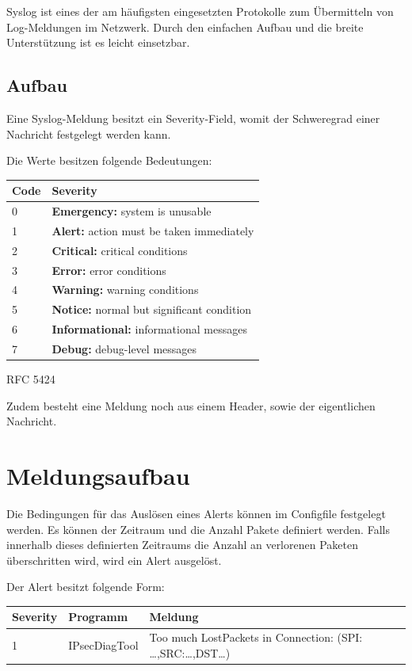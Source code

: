 Syslog ist eines der am häufigsten eingesetzten Protokolle zum Übermitteln von Log-Meldungen im Netzwerk. Durch den einfachen Aufbau und die breite Unterstützung ist es leicht einsetzbar.


\subsection{ Aufbau}

Eine Syslog-Meldung besitzt ein Severity-Field, womit der Schweregrad einer Nachricht festgelegt werden kann.

\noindent Die Werte besitzen folgende Bedeutungen:

\begin{tabular}{|p{0.5in}|p{3.7in}|} \hline 
Code & \textbf{Severity} \\ \hline 
0 & \textbf{Emergency:} system is unusable \\ \hline 
1 & \textbf{Alert:} action must be taken immediately \\ \hline 
2 & \textbf{Critical:} critical conditions \\ \hline 
3 & \textbf{Error:} error conditions \\ \hline 
4 & \textbf{Warning:} warning conditions \\ \hline 
5 & \textbf{Notice:} normal but significant condition \\ \hline 
6 & \textbf{Informational:} informational messages \\ \hline 
7 & \textbf{Debug:} debug-level messages \\ \hline 
\end{tabular}

RFC 5424

Zudem besteht eine Meldung noch aus einem Header, sowie der eigentlichen Nachricht.

\section{ Meldungsaufbau}

\noindent Die Bedingungen für das Auslösen eines Alerts können im Configfile festgelegt werden. Es können der Zeitraum und die Anzahl Pakete definiert werden. Falls innerhalb dieses definierten Zeitraums die Anzahl an verlorenen Paketen überschritten wird, wird ein Alert ausgelöst.

\noindent Der Alert besitzt folgende Form:

\begin{tabular}{|p{0.5in}|p{0.7in}|p{3.0in}|} \hline 
Severity & Programm & Meldung \\ \hline 
1 & IPsecDiagTool & Too much LostPackets in Connection: (SPI: \dots ,SRC:\dots ,DST\dots ) \\ \hline 
\end{tabular}


